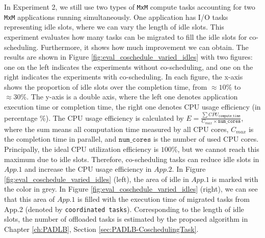In Experiment 2, we still use two types of \texttt{MxM} compute tasks accounting for two \texttt{MxM} applications running simultaneously. One application has I/O tasks representing idle slots, where we can vary the length of idle slots. This experiment evaluates how many tasks can be migrated to fill the idle slots for co-scheduling. Furthermore, it shows how much improvement we can obtain. The results are shown in Figure \ref{fig:eval_coschedule_varied_idles} with two figures: one on the left indicates the experiments without co-scheduling, and one on the right indicates the experiments with co-scheduling. In each figure, the x-axis shows the proportion of idle slots over the completion time, from $\approx 10\%$ to $\approx 30\%$. The y-axis is a double axis, where the left one denotes application execution time or completion time, the right one denotes CPU usage efficiency (in percentage $\%$). The CPU usage efficiency is calculated by $E = \frac{\sum CPU_{\texttt{compute\_time}}}{C_{max} \times \texttt{num\_cores}}$, where the sum means all computation time measured by all CPU cores, $C_{max}$ is the completion time in parallel, and $\texttt{num\_cores}$ is the number of used CPU cores.\\

Principally, the ideal CPU utilization efficiency is $100\%$, but we cannot reach this maximum due to idle slots. Therefore, co-scheduling tasks can reduce idle slots in $App.1$ and increase the CPU usage efficiency in $App.2$. In Figure \ref{fig:eval_coschedule_varied_idles} (left), the area of idle in $App.1$ is marked with the color in grey. In Figure \ref{fig:eval_coschedule_varied_idles} (right), we can see that this area of $App.1$ is filled with the execution time of migrated tasks from App.2 (denoted by \texttt{coordinated tasks}). Corresponding to the length of idle slots, the number of offloaded tasks is estimated by the proposed algorithm in Chapter \ref{ch:PADLB}, Section \ref{sec:PADLB-CoschedulingTask}. \\

